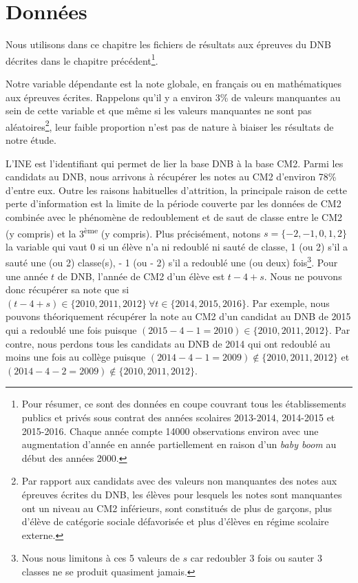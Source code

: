 \documentclass[
]{book}
\begin{document}
\hypertarget{pedata}{%
\section{Données}\label{pedata}}

Nous utilisons dans ce chapitre les fichiers de résultats aux épreuves du DNB décrites dans le chapitre précédent\footnote{Pour résumer, ce sont des données en coupe couvrant tous les établissements publics et privés sous contrat des années scolaires 2013-2014, 2014-2015 et 2015-2016. Chaque année compte 14000 observations environ avec une augmentation d'année en année partiellement en raison d'un \emph{baby boom} au début des années 2000.}.

\quad Notre variable dépendante est la note globale, en français ou en mathématiques aux épreuves écrites. Rappelons qu'il y a environ 3\% de valeurs manquantes au sein de cette variable et que même si les valeurs manquantes ne sont pas aléatoires\footnote{Par rapport aux candidats avec des valeurs non manquantes des notes aux épreuves écrites du DNB, les élèves pour lesquels les notes sont manquantes ont un niveau au CM2 inférieurs, sont constitués de plus de garçons, plus d'élève de catégorie sociale défavorisée et plus d'élèves en régime scolaire externe.}, leur faible proportion n'est pas de nature à biaiser les résultats de notre étude.

\quad L'INE est l'identifiant qui permet de lier la base DNB à la base CM2. Parmi les candidats au DNB, nous arrivons à récupérer les notes au CM2 d'environ 78\% d'entre eux. Outre les raisons habituelles d'attrition, la principale raison de cette perte d'information est la limite de la période couverte par les données de CM2 combinée avec le phénomène de redoublement et de saut de classe entre le CM2 (y compris) et la 3\textsuperscript{ème} (y compris). Plus précisément, notons \(s = \{- 2, - 1, 0, 1, 2\}\) la variable qui vaut 0 si un élève n'a ni redoublé ni sauté de classe, 1 (ou 2) s'il a sauté une (ou 2) classe(s), - 1 (ou - 2) s'il a redoublé une (ou deux) fois\footnote{Nous nous limitons à ces 5 valeurs de \(s\) car redoubler 3 fois ou sauter 3 classes ne se produit quasiment jamais.}. Pour une année \(t\) de DNB, l'année de CM2 d'un élève est \(t - 4 + s\). Nous ne pouvons donc récupérer sa note que si \((t - 4 + s) \in \{2010, 2011, 2012\} \ \forall t \in \{2014, 2015, 2016\}\). Par exemple, nous pouvons théoriquement récupérer la note au CM2 d'un candidat au DNB de 2015 qui a redoublé une fois puisque \((2015 - 4 - 1 = 2010) \in \{2010, 2011, 2012\}\). Par contre, nous perdons tous les candidats au DNB de 2014 qui ont redoublé au moins une fois au collège puisque \((2014 - 4 - 1 = 2009) \notin \{2010, 2011, 2012\}\) et \((2014 - 4 - 2 = 2009) \notin \{2010, 2011, 2012\}\).
\end{document}

